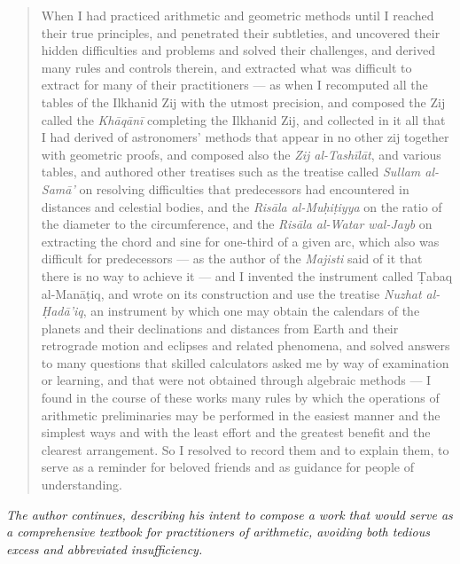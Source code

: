 \documentclass[11pt,a4paper]{article}
\newcommand{\cnote}[1]{\textcolor{notecolor}{\textit{#1}}}
\begin{document}
\begin{quote}
When I had practiced arithmetic and geometric methods until I reached
their true principles, and penetrated their subtleties, and uncovered
their hidden difficulties and problems and solved their challenges, and
derived many rules and controls therein, and extracted what was
difficult to extract for many of their practitioners --- as when I
recomputed all the tables of the Ilkhanid Zij with the utmost precision,
and composed the Zij called the \textit{Kh\=aq\=an\=i} completing the Ilkhanid
Zij, and collected in it all that I had derived of astronomers' methods
that appear in no other zij together with geometric proofs, and composed
also the \textit{Zij al-Tash\=il\=at}, and various tables, and authored other
treatises such as the treatise called \textit{Sullam al-Sam\=a'} on
resolving difficulties that predecessors had encountered in distances and
celestial bodies, and the \textit{Ris\=ala al-Mu\d{h}i\d{t}iyya} on the ratio of
the diameter to the circumference, and the \textit{Ris\=ala al-Watar
wal-Jayb} on extracting the chord and sine for one-third of a given
arc, which also was difficult for predecessors --- as the author of the
\textit{Majisti} said of it that there is no way to achieve it --- and I
invented the instrument called \d{T}abaq al-Man\=a\d{t}iq, and wrote on
its construction and use the treatise \textit{Nuzhat al-\d{H}ad\=a'iq}, an
instrument by which one may obtain the calendars of the planets and their
declinations and distances from Earth and their retrograde motion and
eclipses and related phenomena, and solved answers to many questions
that skilled calculators asked me by way of examination or learning, and
that were not obtained through algebraic methods --- I found in the course
of these works many rules by which the operations of arithmetic
preliminaries may be performed in the easiest manner and the simplest
ways and with the least effort and the greatest benefit and the clearest
arrangement. So I resolved to record them and to explain them, to serve
as a reminder for beloved friends and as guidance for people of
understanding.
\end{quote}

\vspace{0.5cm}
\noindent\cnote{The author continues, describing his intent to compose a work that would
serve as a comprehensive textbook for practitioners of arithmetic,
avoiding both tedious excess and abbreviated insufficiency.}
\clearpage

\end{document}
